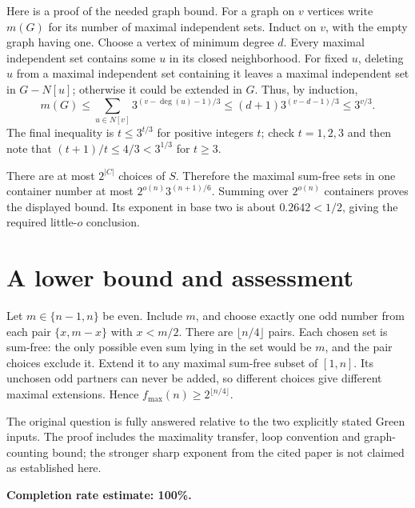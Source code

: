 \documentclass[11pt]{article}
\begin{document}
Here is a proof of the needed graph bound. For a graph on $v$ vertices write $m(G)$ for its number of maximal independent sets. Induct on $v$, with the empty graph having one. Choose a vertex of minimum degree $d$. Every maximal independent set contains some $u$ in its closed neighborhood. For fixed $u$, deleting $u$ from a maximal independent set containing it leaves a maximal independent set in $G-N[u]$; otherwise it could be extended in $G$. Thus, by induction,
\[
 m(G)\le\sum_{u\in N[v]}3^{(v-\deg(u)-1)/3}
 \le(d+1)3^{(v-d-1)/3}\le3^{v/3}.
\]
The final inequality is $t\le3^{t/3}$ for positive integers $t$; check $t=1,2,3$ and then note that $(t+1)/t\le4/3<3^{1/3}$ for $t\ge3$.

There are at most $2^{|C|}$ choices of $S$. Therefore the maximal sum-free sets in one container number at most $2^{o(n)}3^{(n+1)/6}$. Summing over $2^{o(n)}$ containers proves the displayed bound. Its exponent in base two is about $0.2642<1/2$, giving the required little-$o$ conclusion.

\section*{A lower bound and assessment}
Let $m\in\{n-1,n\}$ be even. Include $m$, and choose exactly one odd number from each pair $\{x,m-x\}$ with $x<m/2$. There are $\lfloor n/4\rfloor$ pairs. Each chosen set is sum-free: the only possible even sum lying in the set would be $m$, and the pair choices exclude it. Extend it to any maximal sum-free subset of $[1,n]$. Its unchosen odd partners can never be added, so different choices give different maximal extensions. Hence $f_{\max}(n)\ge2^{\lfloor n/4\rfloor}$.

The original question is fully answered relative to the two explicitly stated Green inputs. The proof includes the maximality transfer, loop convention and graph-counting bound; the stronger sharp exponent from the cited paper is not claimed as established here.

\textbf{Completion rate estimate: 100\%.}
\end{document}
